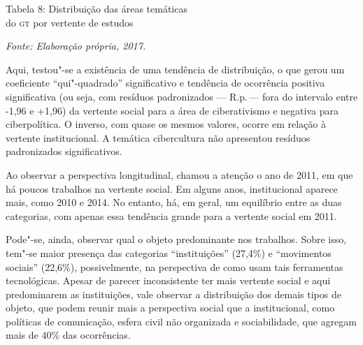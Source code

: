 \begin{center}
Tabela 8: Distribuição das áreas temáticas\\ do \textsc{gt} por vertente de estudos\bigskip


{\footnotesize\emph{Fonte: Elaboração própria, 2017.}}
\end{center}

Aqui, testou"-se a existência de uma tendência de distribuição, o que
gerou um coeficiente ``qui"-quadrado'' significativo e tendência de
ocorrência positiva significativa (ou seja, com resíduos padronizados ---
R.p.\,--- fora do intervalo entre -1,96 e +1,96) da vertente social para a
área de ciberativismo e negativa para ciberpolítica. O inverso, com
quase os mesmos valores, ocorre em relação à vertente institucional. A
temática cibercultura não apresentou resíduos padronizados
significativos.

Ao observar a perspectiva longitudinal, chamou a atenção o ano de 2011,
em que há poucos trabalhos na vertente social. Em alguns anos,
institucional aparece mais, como 2010 e 2014. No entanto, há, em geral,
um equilíbrio entre as duas categorias, com apenas essa tendência grande
para a vertente social em 2011.

Pode"-se, ainda, observar qual o objeto predominante nos trabalhos. Sobre
isso, tem"-se maior presença das categorias ``instituições'' (27,4\%) e
``movimentos sociais'' (22,6\%), possivelmente, na perspectiva de como
usam tais ferramentas tecnológicas. Apesar de parecer inconsistente ter
mais vertente social e aqui predominarem as instituições, vale observar
a distribuição dos demais tipos de objeto, que podem reunir mais a
perspectiva social que a institucional, como políticas de comunicação,
esfera civil não organizada e sociabilidade, que agregam mais de 40\%
das ocorrências.

